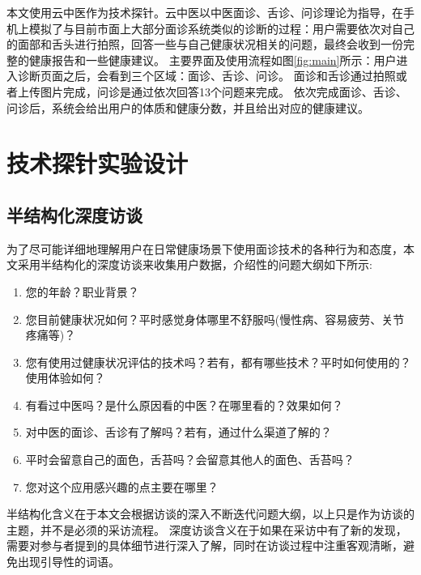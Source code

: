 本文使用云中医作为技术探针。云中医以中医面诊、舌诊、问诊理论为指导，在手机上模拟了与目前市面上大部分面诊系统类似的诊断的过程：用户需要依次对自己的面部和舌头进行拍照，回答一些与自己健康状况相关的问题，最终会收到一份完整的健康报告和一些健康建议。
主要界面及使用流程如图\ref{fig:main}所示：用户进入诊断页面之后，会看到三个区域：面诊、舌诊、问诊。
面诊和舌诊通过拍照或者上传图片完成，问诊是通过依次回答13个问题来完成。
依次完成面诊、舌诊、问诊后，系统会给出用户的体质和健康分数，并且给出对应的健康建议。

\section{技术探针实验设计}

\subsection{半结构化深度访谈}

为了尽可能详细地理解用户在日常健康场景下使用面诊技术的各种行为和态度，本文采用半结构化的深度访谈来收集用户数据\cite{DiciccoThe}，介绍性的问题大纲如下所示:
\begin{enumerate}
    \item 您的年龄？职业背景？
    \item 您目前健康状况如何？平时感觉身体哪里不舒服吗(慢性病、容易疲劳、关节疼痛等)？
    \item 您有使用过健康状况评估的技术吗？若有，都有哪些技术？平时如何使用的？使用体验如何？
    \item 有看过中医吗？是什么原因看的中医？在哪里看的？效果如何？
    \item 对中医的面诊、舌诊有了解吗？若有，通过什么渠道了解的？
    \item 平时会留意自己的面色，舌苔吗？会留意其他人的面色、舌苔吗？
    \item 您对这个应用感兴趣的点主要在哪里？
\end{enumerate}

半结构化含义在于本文会根据访谈的深入不断迭代问题大纲，以上只是作为访谈的主题，并不是必须的采访流程。
深度访谈含义在于如果在采访中有了新的发现，需要对参与者提到的具体细节进行深入了解，同时在访谈过程中注重客观清晰，避免出现引导性的词语。

